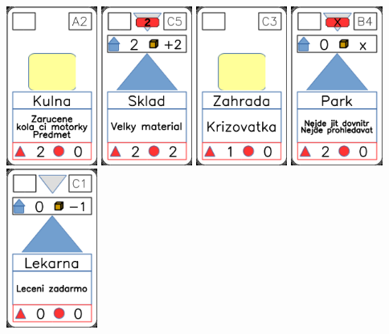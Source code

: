 \documentclass[a4paper]{article}
\begin{document}
	\includegraphics[width=3.0cm]{img-2_16}
	\includegraphics[width=3.0cm]{img-3_14}
	\includegraphics[width=3.0cm]{img-2_27}
	\includegraphics[width=3.0cm]{img-3_23}
	\includegraphics[width=3.0cm]{img-3_10}
\end{document}
